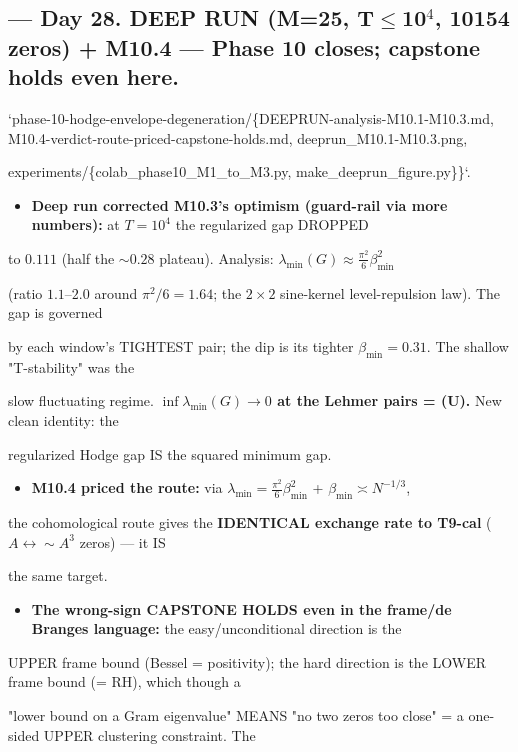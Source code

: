 \documentclass[10pt]{article}
\begin{document}
\subsection*{ --- Day 28. DEEP RUN (M=25, T\ensuremath{\le}10\ensuremath{^4}, 10154 zeros) + M10.4 --- Phase 10 closes; capstone holds even here.}
`phase-10-hodge-envelope-degeneration/\{DEEPRUN-analysis-M10.1-M10.3.md, M10.4-verdict-route-priced-capstone-holds.md, deeprun\_M10.1-M10.3.png,\par
experiments/\{colab\_phase10\_M1\_to\_M3.py, make\_deeprun\_figure.py\}\}`.\par
\begin{itemize}
\item \textbf{Deep run corrected M10.3's optimism (guard-rail via more numbers):} at $T{=}10^4$ the regularized gap DROPPED
\end{itemize}
  to $0.111$ (half the $\sim0.28$ plateau). Analysis: $\boxed{\lambda_{\min}(G)\approx\frac{\pi^2}{6}\beta_{\min}^2}$\par
  (ratio $1.1$--$2.0$ around $\pi^2/6{=}1.64$; the $2{\times}2$ sine-kernel level-repulsion law). The gap is governed\par
  by each window's TIGHTEST pair; the dip is its tighter $\beta_{\min}{=}0.31$. The shallow "T-stability" was the\par
  slow fluctuating regime. \textbf{$\inf\lambda_{\min}(G)\to0$ at the Lehmer pairs = (U).} New clean identity: the\par
  regularized Hodge gap IS the squared minimum gap.\par
\begin{itemize}
\item \textbf{M10.4 priced the route:} via $\lambda_{\min}{=}\frac{\pi^2}{6}\beta_{\min}^2$ + $\beta_{\min}\asymp N^{-1/3}$,
\end{itemize}
  the cohomological route gives the \textbf{IDENTICAL exchange rate to T9-cal} ($A\leftrightarrow\sim A^3$ zeros) --- it IS\par
  the same target.\par
\begin{itemize}
\item \textbf{The wrong-sign CAPSTONE HOLDS even in the frame/de Branges language:} the easy/unconditional direction is the
\end{itemize}
  UPPER frame bound (Bessel = positivity); the hard direction is the LOWER frame bound (= RH), which though a\par
  "lower bound on a Gram eigenvalue" MEANS "no two zeros too close" = a one-sided UPPER clustering constraint. The\par
\end{document}
